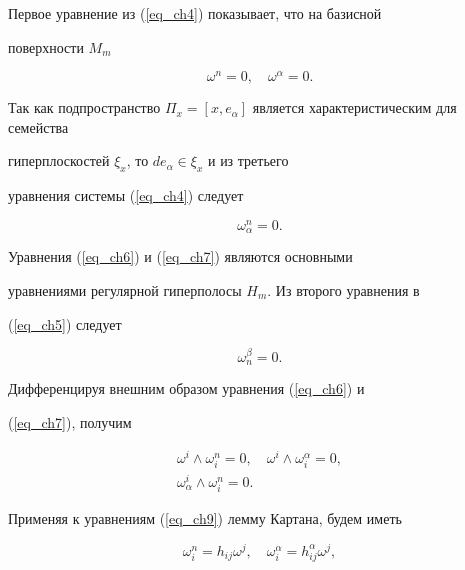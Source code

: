 Первое уравнение из (\ref{eq_ch4}) показывает, что на базисной


поверхности $M_m$


\begin{equation}


\label{eq_ch6}


\omega^n=0,\quad \omega^{\alpha}=0 .


\end{equation}


Так как подпространство $\Pi _x=\left[x,


e_{\alpha}\right]$ является характеристическим для семейства


гиперплоскостей $\xi_x$, то $de_{\alpha}\in\xi_x$ и из третьего


уравнения системы (\ref{eq_ch4}) следует


\begin{equation}


\label{eq_ch7}


\omega^n_{\alpha}=0 .


\end{equation}


Уравнения (\ref{eq_ch6}) и (\ref{eq_ch7}) являются основными


уравнениями регулярной гиперполосы $H_m$. Из второго уравнения в


(\ref{eq_ch5}) следует


$$


\omega^\beta_n=0.


$$


Дифференцируя внешним образом уравнения (\ref{eq_ch6}) и


(\ref{eq_ch7}), получим


\begin{gather}


\label{eq_ch9}


\omega^i\wedge\omega^n_i=0,\quad \omega^i\wedge\omega^{\alpha}_i=0,\\


%


\label{eq_ch10}


\omega^i_{\alpha}\wedge\omega^n_i=0 .


\end{gather}


Применяя к уравнениям (\ref{eq_ch9}) лемму Картана, будем иметь


\begin{equation}


\label{eq_ch11}


\omega^n_i=h_{ij}\omega^j,\quad \omega^{\alpha}_i=h^{\alpha}_{ij}\omega^j ,


\end{equation}


